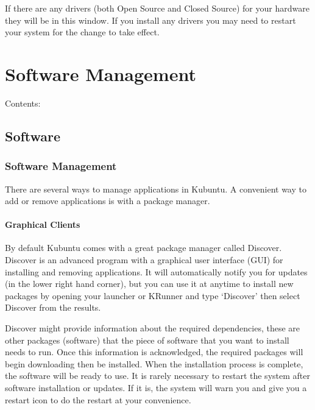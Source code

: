 \documentclass[letterpaper,10pt,english]{sphinxmanual}
\begin{document}

\sphinxAtStartPar
If there are any drivers (both Open Source and Closed Source) for your hardware they will be in this window. If you install any drivers you may need to restart your system for the change to take effect.


\chapter{Software Management}
\label{\detokenize{docs/software-management/software-list:software-management}}\label{\detokenize{docs/software-management/software-list::doc}}
\sphinxAtStartPar
Contents:


\section{Software}
\label{\detokenize{docs/software-management/software:software}}\label{\detokenize{docs/software-management/software:software-link}}\label{\detokenize{docs/software-management/software::doc}}

\subsection{Software Management}
\label{\detokenize{docs/software-management/software:software-management}}
\sphinxAtStartPar
There are several ways to manage applications in Kubuntu. A convenient way to add or remove applications is with a package manager.


\subsubsection{Graphical Clients}
\label{\detokenize{docs/software-management/software:graphical-clients}}
\sphinxAtStartPar
By default Kubuntu comes with a great package manager called Discover. Discover is an advanced program with a graphical user interface (GUI) for installing and removing applications. It will automatically notify you for updates (in the lower right hand corner), but you can use it at anytime to install new packages by opening your launcher or KRunner and type ‘Discover’ then select  Discover from the results.

\noindent{}

\sphinxAtStartPar
Discover might provide information about the required dependencies, these are other packages (software) that the piece of software that you want to install needs to run. Once this information is acknowledged, the required packages will begin downloading then be installed. When the installation process is complete, the software will be ready to use. It is rarely necessary to restart the system after software installation or updates. If it is, the system will warn you and give you a restart icon to do the restart at your convenience.
\end{document}
